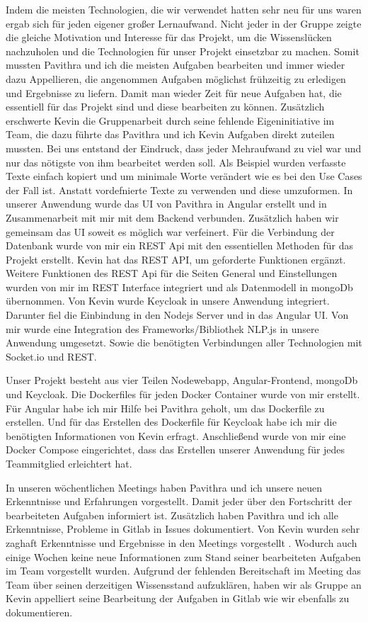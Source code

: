 \noindent Indem die meisten Technologien, die wir verwendet hatten sehr neu für uns waren ergab sich für jeden eigener großer Lernaufwand.
Nicht jeder in der Gruppe zeigte die gleiche Motivation und Interesse für das Projekt, um die Wissenslücken nachzuholen und die Technologien für unser Projekt einsetzbar zu machen.
Somit mussten Pavithra und ich die meisten Aufgaben bearbeiten und immer wieder dazu Appellieren, die angenommen Aufgaben möglichst frühzeitig zu erledigen und Ergebnisse zu liefern.
Damit man wieder Zeit für neue Aufgaben hat, die essentiell für das Projekt sind und diese bearbeiten zu können.
Zusätzlich erschwerte Kevin die Gruppenarbeit durch seine fehlende Eigeninitiative im Team, die dazu führte das Pavithra und ich Kevin Aufgaben direkt zuteilen mussten.
Bei uns entstand der Eindruck, dass jeder Mehraufwand zu viel war und nur das nötigste von ihm bearbeitet werden soll.
Als Beispiel wurden verfasste Texte einfach kopiert und um minimale Worte verändert wie es bei den Use Cases der Fall ist.
Anstatt vordefnierte Texte zu verwenden und diese umzuformen.
In unserer Anwendung wurde das UI von Pavithra in Angular erstellt und in Zusammenarbeit mit mir mit dem Backend verbunden.
Zusätzlich haben wir gemeinsam das UI soweit es möglich war verfeinert.
Für die Verbindung der Datenbank wurde von mir ein REST Api mit den essentiellen Methoden für das Projekt erstellt.
Kevin hat das REST API, um geforderte Funktionen ergänzt.
Weitere Funktionen des REST Api für die Seiten General und Einstellungen wurden von mir im REST Interface integriert und als Datenmodell in mongoDb übernommen.
Von Kevin wurde Keycloak in unsere Anwendung integriert.
Darunter fiel die Einbindung in den Nodejs Server und in das Angular UI.
Von mir wurde eine Integration des Frameworks/Bibliothek NLP.js in unsere Anwendung umgesetzt.
Sowie die benötigten Verbindungen aller Technologien mit Socket.io und REST.

\noindent Unser Projekt besteht aus vier Teilen Nodewebapp, Angular-Frontend, mongoDb und Keycloak.
Die Dockerfiles für jeden Docker Container wurde von mir erstellt.
Für Angular habe ich mir Hilfe bei Pavithra geholt, um das Dockerfile zu erstellen.
Und für das Erstellen des Dockerfile für Keycloak habe ich mir die benötigten Informationen von Kevin erfragt.
Anschließend wurde von mir eine Docker Compose eingerichtet, dass das Erstellen unserer Anwendung für jedes Teammitglied erleichtert hat.

\noindent In unseren wöchentlichen Meetings haben Pavithra und ich unsere neuen Erkenntnisse und Erfahrungen vorgestellt.
Damit jeder über den Fortschritt der bearbeiteten Aufgaben informiert ist.
Zusätzlich haben Pavithra und ich alle Erkenntnisse, Probleme in Gitlab in Issues dokumentiert.
Von Kevin wurden sehr zaghaft Erkenntnisse und Ergebnisse in den Meetings vorgestellt .
Wodurch auch einige Wochen keine neue Informationen zum Stand seiner bearbeiteten Aufgaben im Team vorgestellt wurden.
Aufgrund der fehlenden Bereitschaft im Meeting das Team über seinen derzeitigen Wissensstand aufzuklären,
haben wir als Gruppe an Kevin appelliert seine Bearbeitung der Aufgaben in Gitlab wie wir ebenfalls zu dokumentieren.

